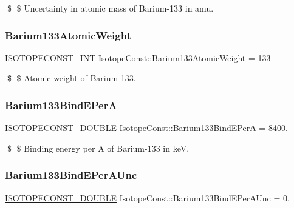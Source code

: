 \$ \$ Uncertainty in atomic mass of Barium-\/133 in amu. \mbox{\label{group___isotope_const-_barium-_ba133_ga7a64456b83ce885396f45e0763b25b70}} 
\subsubsection{\texorpdfstring{Barium133\+Atomic\+Weight}{Barium133AtomicWeight}}
{\footnotesize\ttfamily \mbox{\hyperlink{group___isotope_const-_macros_ga5f18360b3e99483a35c32d789e62621c}{I\+S\+O\+T\+O\+P\+E\+C\+O\+N\+S\+T\+\_\+\+I\+NT}} Isotope\+Const\+::\+Barium133\+Atomic\+Weight = 133}

\$ \$ Atomic weight of Barium-\/133. \mbox{\label{group___isotope_const-_barium-_ba133_ga44a1c1d4c4521bf7be2df912939cae64}} 
\subsubsection{\texorpdfstring{Barium133\+Bind\+E\+PerA}{Barium133BindEPerA}}
{\footnotesize\ttfamily \mbox{\hyperlink{group___isotope_const-_macros_ga8f45a7272ce02c0b4c65c44636ed719a}{I\+S\+O\+T\+O\+P\+E\+C\+O\+N\+S\+T\+\_\+\+D\+O\+U\+B\+LE}} Isotope\+Const\+::\+Barium133\+Bind\+E\+PerA = 8400.}

\$ \$ Binding energy per A of Barium-\/133 in keV. \mbox{\label{group___isotope_const-_barium-_ba133_ga158b507c466d184ea65e3cb6d1aed5df}} 
\subsubsection{\texorpdfstring{Barium133\+Bind\+E\+Per\+A\+Unc}{Barium133BindEPerAUnc}}
{\footnotesize\ttfamily \mbox{\hyperlink{group___isotope_const-_macros_ga8f45a7272ce02c0b4c65c44636ed719a}{I\+S\+O\+T\+O\+P\+E\+C\+O\+N\+S\+T\+\_\+\+D\+O\+U\+B\+LE}} Isotope\+Const\+::\+Barium133\+Bind\+E\+Per\+A\+Unc = 0.}

